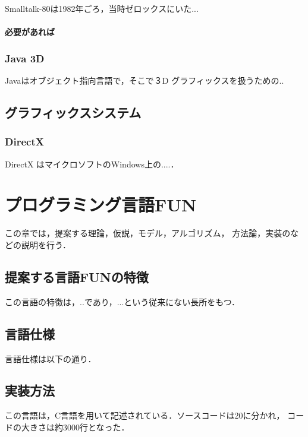 \documentclass{funthesis}
\begin{document}
Smalltalk-80は1982年ごろ，当時ゼロックスにいた...

\subsubsection{必要があれば} %

\subsection{Java 3D}

Javaはオブジェクト指向言語で，そこで３D グラフィックスを扱うための..

\section{グラフィックスシステム}

\subsection{DirectX}

DirectX はマイクロソフトのWindows上の....．


\chapter{プログラミング言語FUN}

この章では，提案する理論，仮説，モデル，アルゴリズム，
方法論，実装のなどの説明を行う．

\section{提案する言語FUNの特徴}

この言語の特徴は，..であり，...という従来にない長所をもつ．

\section{言語仕様}

言語仕様は以下の通り．


\section{実装方法}

この言語は，C言語を用いて記述されている．ソースコードは20に分かれ，
コードの大きさは約3000行となった．
\end{document}
